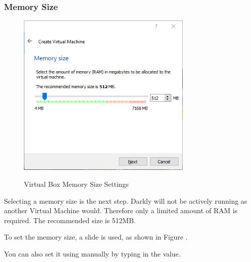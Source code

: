 \subsubsection{Memory Size}
\begin{figure}[!htb]
    \centering
    \includegraphics[width=0.752\textwidth]{images/Win00-02.png}\\[0cm]  
    \caption[Windows Virtual Box]{Virtual Box Memory Size Settings}
    \label{fig:00-03 - Windows Virtual Box Memory Size} 
\end{figure}
Selecting a memory size is the next step. Darkly will not be actively running
as another Virtual Machine would. Therefore only a limited amount of RAM is
required. The recommended size is 512MB.

To set the memory size, a slide is used, as shown in Figure .

You can also set it using manually by typing in the value.

